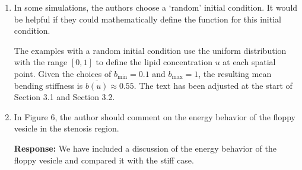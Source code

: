 \documentclass[11pt]{article}
\newcommand{\subfigimg}[3][,]{%
  \setbox1=\hbox{\texttt{[image: \#3]}}%
  \leavevmode\rlap{\usebox1}%
  \rlap{\hspace*{0pt}\raisebox{\dimexpr\ht1-0\baselineskip}{\bf
  \normalsize #2}}%
  \phantom{\usebox1}%
}
\begin{document}
\begin{enumerate}
\noindent
    {\bf Response:} We calculated the tangential velocity of all $N =
    1024$ Lagrangian points for each of the three cases. Plotting all
    1024 lines in the manuscript would be uninformative. To prove this is
    the case, a plot of 32 of the tangential velocities is in
    Figure~\ref{fig:tangVel} of this document. Instead, in the document,
    we report the average tangential velocity in the region $x \in
    [4,10]$, and report the spread of all tangential velocities from
    this mean value. If this spread is less than 15\%, we would
    characterize this as a tank-treading vesicle. Their spread is 1.2\%
    for the stiff single-component vesicle, 12\% for the multicomponent
    case, and 313\% for the floppy single-component case. Therefore, the
    floppy single-component vesicle is not tank-treading, while the
    other two cases are tank-treading. We have made this clear in the
    text.
    {\bf TODO: Change color of Fig 7 lines or state why we don't do
    this.}

\begin{figure}[ht]
  \centering
  \subfigimg[width=0.3\textwidth]{(a)}{figures/SC_treading_velocity_review.pdf}
  \subfigimg[width=0.3\textwidth]{(b)}{figures/SCp55_treading_velocity_review.pdf}
  \subfigimg[width=0.3\textwidth]{(c)}{figures/MCp5_treading_velocity_review.pdf}
  \caption{\label{fig:tangVel} The tangential velocity of 32 points of
  the (a) stiff single-component vesicle, (b) floppy single-component
  vesicle, (c) multicomponent vesicle.}
\end{figure}

\item In some simulations, the authors choose a `random' initial
  condition. It would be helpful if they could mathematically define the
    function for this initial condition.

 The examples with a random initial condition
    use the uniform distribution with the range $[0,1]$ to define the
    lipid concentration $u$ at each spatial point. Given the choices of
    $b_{\min}=0.1$ and $b_{\max}=1$, the resulting mean bending
    stiffness is $\overline{b(u)} \approx 0.55$. The text has been
    adjusted at the start of Section 3.1 and Section 3.2.

\item In Figure 6, the author should comment on the energy behavior of
  the floppy vesicle in the stenosis region.

\noindent
{\bf Response:} We have included a discussion of the energy behavior of
the floppy vesicle and compared it with the stiff case.


\end{enumerate}
\end{document}
